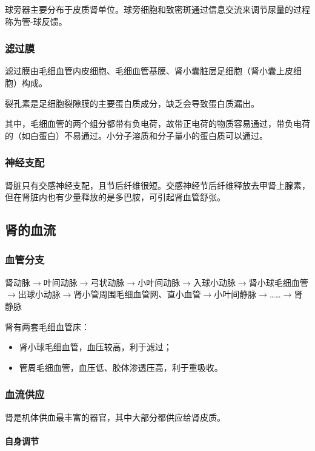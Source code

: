 球旁器主要分布于皮质肾单位。球旁细胞和致密斑通过信息交流来调节尿量的过程称为管-球反馈。

\subsubsection{滤过膜}

滤过膜由毛细血管内皮细胞、毛细血管基膜、肾小囊脏层足细胞（肾小囊上皮细胞）构成。

裂孔素是足细胞裂隙膜的主要蛋白质成分，缺乏会导致蛋白质漏出。

其中，毛细血管的两个组分都带有负电荷，故带正电荷的物质容易通过，带负电荷的（如白蛋白）不易通过。小分子溶质和分子量小的蛋白质可以通过。

\subsubsection{神经支配}

肾脏只有交感神经支配，且节后纤维很短。交感神经节后纤维释放去甲肾上腺素，但在肾脏内也有少量释放的是多巴胺，可引起肾血管舒张。

\subsection{肾的血流}

\subsubsection{血管分支}

肾动脉$\longrightarrow$叶间动脉$\longrightarrow$弓状动脉$\longrightarrow$小叶间动脉$\longrightarrow$入球小动脉$\longrightarrow$肾小球毛细血管$\longrightarrow$出球小动脉$\longrightarrow$肾小管周围毛细血管网、直小血管$\longrightarrow$小叶间静脉$\longrightarrow$……$\longrightarrow$肾静脉

肾有两套毛细血管床：
\begin{itemize}
	\item 肾小球毛细血管，血压较高，利于滤过；
	\item 管周毛细血管，血压低、胶体渗透压高，利于重吸收。
\end{itemize}

\subsubsection{血流供应}

肾是机体供血最丰富的器官，其中大部分都供应给肾皮质。

\paragraph{自身调节}

